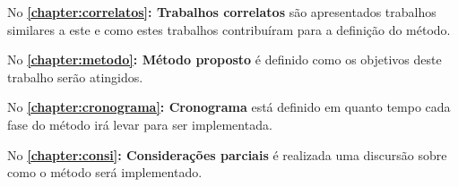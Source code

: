 No \textbf{\autoref{chapter:correlatos}: Trabalhos correlatos} são apresentados trabalhos similares a este e como estes trabalhos contribuíram para a definição do método.

No \textbf{\autoref{chapter:metodo}: Método proposto} é definido como os objetivos deste trabalho serão atingidos.

No \textbf{\autoref{chapter:cronograma}: Cronograma} está definido em quanto tempo cada fase do método irá levar para ser implementada.

No \textbf{\autoref{chapter:consi}: Considerações parciais} é realizada uma discursão sobre como o método será implementado.





% 
